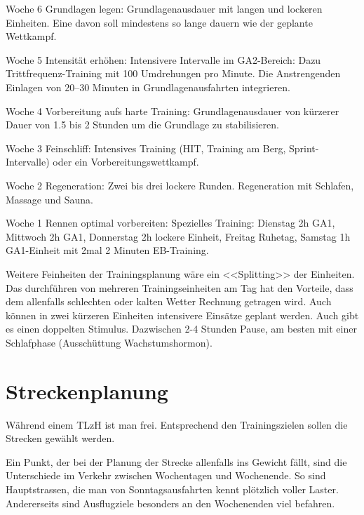 \documentclass[a4paper,DIV13,BCOR0cm]{scrartcl}
\newcommand{\tlzh}{TLzH}
\begin{document}
\begin{itemize*}
        \item Woche 6 Grundlagen legen:
                Grundlagenausdauer mit langen und lockeren Einheiten.
                Eine davon soll mindestens so lange dauern wie der geplante Wettkampf.
        \item Woche 5 Intensität erhöhen:
                Intensivere Intervalle im GA2-Bereich:
                Dazu Trittfrequenz-Training mit 100 Umdrehungen pro Minute.
                Die Anstrengenden Einlagen von 20--30 Minuten in Grundlagenausfahrten integrieren.
        \item Woche 4 Vorbereitung aufs harte Training:
                Grundlagenausdauer von kürzerer Dauer von 1.5 bis 2 Stunden
                um die Grundlage zu stabilisieren.
        \item Woche 3 Feinschliff:
                Intensives Training (HIT, Training am Berg, Sprint-Intervalle) oder ein Vorbereitungswettkampf.
        \item Woche 2 Regeneration:
                Zwei bis drei lockere Runden. Regeneration mit Schlafen, Massage und Sauna.
        \item Woche 1 Rennen optimal vorbereiten:
                Spezielles Training: Dienstag 2h GA1, Mittwoch 2h GA1, Donnerstag 2h lockere Einheit, Freitag Ruhetag, 
                Samstag 1h GA1-Einheit mit 2mal 2 Minuten EB-Training.

\end{itemize*}

Weitere Feinheiten der Trainingsplanung wäre ein <<Splitting>> der Einheiten.
Das durchführen von mehreren Trainingseinheiten am Tag hat den Vorteile,
dass dem allenfalls schlechten oder kalten Wetter Rechnung getragen wird.
Auch können in zwei kürzeren Einheiten intensivere Einsätze geplant werden.
Auch gibt es einen doppelten Stimulus.
Dazwischen 2-4 Stunden Pause, am besten mit einer Schlafphase (Ausschüttung Wachstumshormon).

\section{Streckenplanung}

Während einem \tlzh{} ist man frei. Entsprechend den Trainingszielen sollen die Strecken gewählt werden.

Ein Punkt, der bei der Planung der Strecke allenfalls ins Gewicht fällt,
sind die Unterschiede im Verkehr zwischen Wochentagen und Wochenende.
So sind Hauptstrassen, die man von Sonntagsausfahrten kennt plötzlich voller Laster.
Andererseits sind Ausflugziele besonders an den Wochenenden viel befahren.
\end{document}
